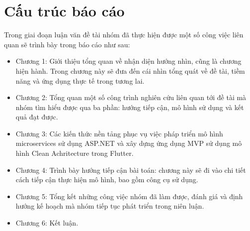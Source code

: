 \section{Cấu trúc báo cáo}
Trong giai đoạn luận văn đề tài nhóm đã thực hiện được một số công việc liên quan sẽ trình bày trong báo cáo như sau:

\begin{itemize}
    \item Chương 1: Giới thiệu tổng quan về nhận diện hướng nhìn, cũng là chương hiện hành. Trong chương này sẽ đưa đến cái nhìn tổng quát về đề tài, tiềm năng và ứng dụng thực tế trong tương lai.
    \item Chương 2: Tổng quan một số công trình nghiên cứu liên quan tới đề tài mà nhóm tìm hiểu được qua ba phần: hướng tiếp cận, mô hình sử dụng và kết quả đạt được.
    \item Chương 3: Các kiến thức nền tảng phục vụ việc pháp triển mô hình microservices sử dụng ASP.NET và xây dựng ứng dụng MVP sử dụng mô hình Clean Achritecture trong Flutter.
    \item Chương 4: Trình bày hướng tiếp cận bài toán: chương này sẽ đi vào chi tiết cách tiếp cận thực hiện mô hình, bao gồm công cụ sử dụng.
    \item Chương 5: Tổng kết những công việc nhóm đã làm được, đánh giá và định hướng kế hoạch mà nhóm tiếp tục phát triển trong niên luận.
    \item Chương 6: Kết luận.
\end{itemize}


